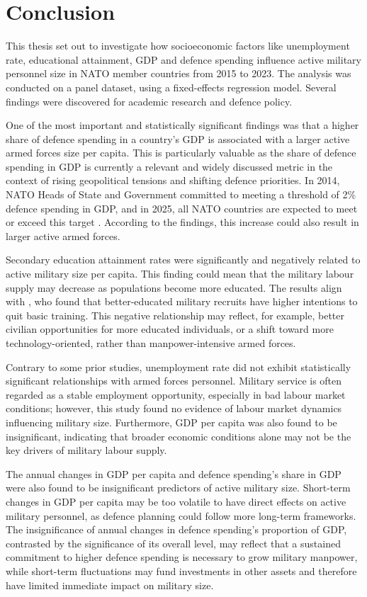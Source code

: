 \chapter{Conclusion}

This thesis set out to investigate how socioeconomic factors like unemployment rate, educational 
attainment, GDP and defence spending influence active military personnel size in NATO member countries 
from 2015 to 2023. The analysis was conducted on a panel dataset, using a fixed-effects regression model.
Several findings were discovered for academic research and defence policy.

One of the most important and statistically significant findings was that a higher share of defence 
spending in a country's GDP is associated with a larger active armed forces size per capita.
This is particularly valuable as the share of defence spending in GDP is currently a relevant and 
widely discussed metric in the context of rising geopolitical tensions and shifting defence priorities.
In 2014, NATO Heads of State and Government committed to meeting a threshold of 2\% defence spending in GDP, and in 2025, all NATO countries are expected to meet or exceed this target \parencite{nato_defence_2025}. 
According to the findings, this increase could also result in larger active armed forces.

Secondary education attainment rates were significantly and negatively related to active military 
size per capita. This finding could mean that the military labour 
supply may decrease as populations become more educated. The results align with \textcite{hof_quality_2023}, 
who found that better-educated military recruits have higher intentions to quit basic training.
This negative relationship may reflect, for example, better civilian opportunities 
for more educated individuals, or a shift toward more technology-oriented, rather than 
manpower-intensive armed forces.

Contrary to some prior studies, unemployment rate did not exhibit statistically significant 
relationships with armed forces personnel. Military service is often regarded as a stable
employment opportunity, especially in bad labour market conditions; however, this study found 
no evidence of labour market dynamics influencing military size. Furthermore, GDP per capita was 
also found to be insignificant, indicating that broader economic conditions alone may not be the 
key drivers of military labour supply.

The annual changes in GDP per capita and defence spending's share in GDP were also found to be 
insignificant predictors of active military size. Short-term changes in GDP per capita may be 
too volatile to have direct effects on active military personnel, as defence planning could 
follow more long-term frameworks. The insignificance of annual changes in defence spending's 
proportion of GDP, contrasted by the significance of its overall level, may 
reflect that a sustained commitment to higher defence spending is 
necessary to grow military manpower, while short-term fluctuations may fund
investments in other assets and therefore have limited immediate impact on military size.

